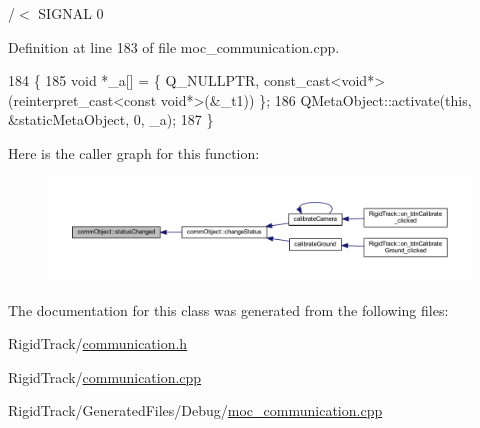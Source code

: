 /$<$ S\+I\+G\+N\+AL 0 



Definition at line 183 of file moc\+\_\+communication.\+cpp.


\begin{DoxyCode}
184 \{
185     \textcolor{keywordtype}{void} *\_a[] = \{ Q\_NULLPTR, \textcolor{keyword}{const\_cast<}\textcolor{keywordtype}{void}*\textcolor{keyword}{>}(\textcolor{keyword}{reinterpret\_cast<}\textcolor{keyword}{const }\textcolor{keywordtype}{void}*\textcolor{keyword}{>}(&\_t1)) \};
186     QMetaObject::activate(\textcolor{keyword}{this}, &staticMetaObject, 0, \_a);
187 \}
\end{DoxyCode}
Here is the caller graph for this function\+:\nopagebreak
\begin{figure}[H]
\begin{center}
\leavevmode
\includegraphics[width=350pt]{classcomm_object_adccf5b5946d35d5cf6d76f367f93e335_icgraph}
\end{center}
\end{figure}


The documentation for this class was generated from the following files\+:\begin{DoxyCompactItemize}
\item 
Rigid\+Track/\hyperlink{communication_8h}{communication.\+h}\item 
Rigid\+Track/\hyperlink{communication_8cpp}{communication.\+cpp}\item 
Rigid\+Track/\+Generated\+Files/\+Debug/\hyperlink{_debug_2moc__communication_8cpp}{moc\+\_\+communication.\+cpp}\end{DoxyCompactItemize}
